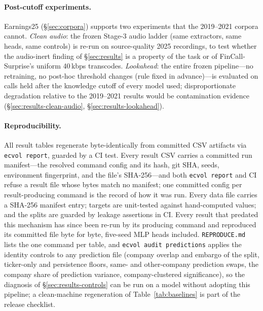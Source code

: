 \paragraph{Post-cutoff experiments.}
Earnings25 (\S\ref{sec:corpora}) supports two experiments that the 2019--2021
corpora cannot. \emph{Clean audio}: the frozen Stage-3 audio ladder (same
extractors, same heads, same controls) is re-run on source-quality 2025 recordings,
to test whether the audio-inert finding of \S\ref{sec:results} is a property of the
task or of FinCall-Surprise's uniform 40\,kbps transcodes. \emph{Lookahead}: the
entire frozen pipeline---no retraining, no post-hoc threshold changes (rule fixed
in advance)---is evaluated on calls held after the knowledge cutoff of every model
used; disproportionate degradation relative to the 2019--2021 results would be
contamination evidence (\S\ref{sec:results-clean-audio}, \S\ref{sec:results-lookahead}).

\paragraph{Reproducibility.}
All result tables regenerate byte-identically from committed CSV artifacts via
\texttt{ecvol report}, guarded by a CI test. Every result CSV carries a committed
run manifest---the resolved command config and its hash, git SHA, seeds,
environment fingerprint, and the file's SHA-256---and both \texttt{ecvol report}
and CI refuse a result file whose bytes match no manifest; one committed config
per result-producing command is the record of how it was run. Every data file
carries a SHA-256 manifest entry; targets are unit-tested against hand-computed
values; and the splits are guarded by leakage assertions in CI. Every result that
predated this mechanism has since been re-run by its producing command and
reproduced its committed file byte for byte, five-seed MLP heads included.
\texttt{REPRODUCE.md} lists the one command per
table, and \texttt{ecvol audit predictions} applies the identity controls to any
prediction file (company overlap and embargo of the split, ticker-only and persistence
floors, same- and other-company prediction swaps, the company share of prediction
variance, company-clustered significance), so the diagnosis of
\S\ref{sec:results-controls} can be run on a model without adopting this pipeline; a clean-machine regeneration of Table~\ref{tab:baselines} is part of the
release checklist.
